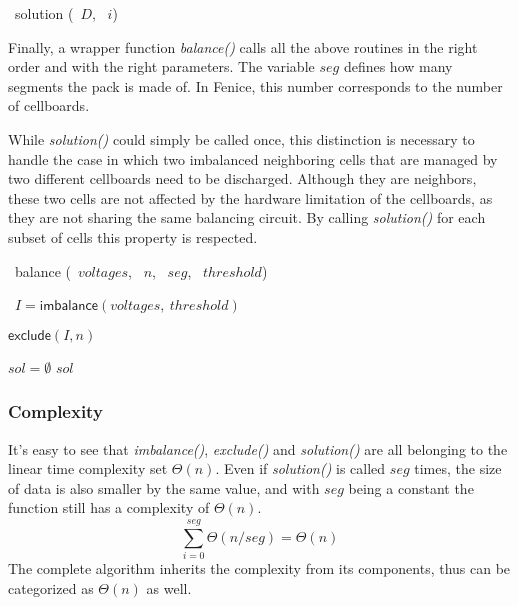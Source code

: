 \begin{algorithm}[H]
    \DontPrintSemicolon
    \NoCaptionOfAlgo
    \caption[solution]{\SET\ \textsf{solution} (\INTARRAY\ $D$, \INTEGER\ $i$)}\label{algorithm:solution}
\end{algorithm}

Finally, a wrapper function \textit{balance()} calls all the above routines in the right order and with the right parameters. The variable $seg$ defines how many segments the pack is made of. In Fenice, this number corresponds to the number of cellboards.

While \textit{solution()} could simply be called once, this distinction is necessary to handle the case in which two imbalanced neighboring cells that are managed by two different cellboards need to be discharged. Although they are neighbors, these two cells are not affected by the hardware limitation of the cellboards, as they are not sharing the same balancing circuit. By calling \textit{solution()} for each subset of cells this property is respected.
\begin{algorithm}
    \DontPrintSemicolon
    \NoCaptionOfAlgo
    \caption[balancing]{\SET\ \textsf{balance} (\INTARRAY\ $voltages$, \INTEGER\ $n$, \INTEGER\ $seg$, \INTEGER\ $threshold$)}\label{algorithm:balancing}

    \INTARRAY\ $I = \textsf{imbalance}(voltages,\ threshold)$\;


    $\textsf{exclude}(I, n)$\;

    $sol=\emptyset$\;
    \Return $sol$\;
\end{algorithm}

\subsubsection{Complexity}
It's easy to see that \textit{imbalance()}, \textit{exclude()} and \textit{solution()} are all belonging to the linear time complexity set $\Theta(n)$.
Even if \textit{solution()} is called $seg$ times, the size of data is also smaller by the same value, and with $seg$ being a constant the function still has a complexity of $\Theta(n)$.
\[
    \sum_{i=0}^{seg} \Theta(n/seg) = \Theta(n)
\]
The complete algorithm inherits the complexity from its components, thus can be categorized as $\Theta(n)$ as well.

